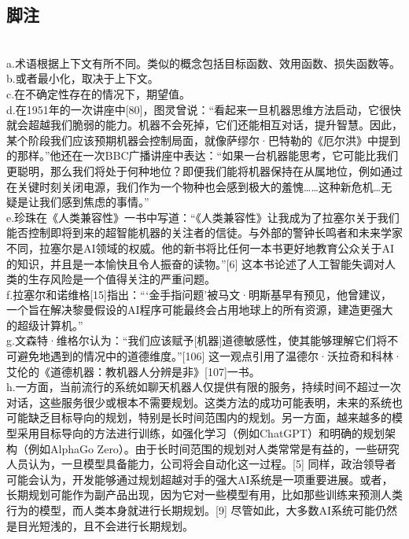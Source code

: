 \subsection{脚注}\\
a.术语根据上下文有所不同。类似的概念包括目标函数、效用函数、损失函数等。\\
b.或者最小化，取决于上下文。\\
c.在不确定性存在的情况下，期望值。\\
d.在1951年的一次讲座中[80]，图灵曾说：“看起来一旦机器思维方法启动，它很快就会超越我们脆弱的能力。机器不会死掉，它们还能相互对话，提升智慧。因此，某个阶段我们应该预期机器会控制局面，就像萨缪尔·巴特勒的《厄尔洪》中提到的那样。”他还在一次BBC广播讲座中表达：“如果一台机器能思考，它可能比我们更聪明，那么我们将处于何种地位？即便我们能将机器保持在从属地位，例如通过在关键时刻关闭电源，我们作为一个物种也会感到极大的羞愧……这种新危机…无疑是让我们感到焦虑的事情。”\\
e.珍珠在《人类兼容性》一书中写道：“《人类兼容性》让我成为了拉塞尔关于我们能否控制即将到来的超智能机器的关注者的信徒。与外部的警钟长鸣者和未来学家不同，拉塞尔是AI领域的权威。他的新书将比任何一本书更好地教育公众关于AI的知识，并且是一本愉快且令人振奋的读物。”[6] 这本书论述了人工智能失调对人类的生存风险是一个值得关注的严重问题。\\
f.拉塞尔和诺维格[15]指出：“‘金手指问题’被马文·明斯基早有预见，他曾建议，一个旨在解决黎曼假设的AI程序可能最终会占用地球上的所有资源，建造更强大的超级计算机。”\\
g.文森特·维格尔认为：“我们应该赋予[机器]道德敏感性，使其能够理解它们将不可避免地遇到的情况中的道德维度。”[106] 这一观点引用了温德尔·沃拉奇和科林·艾伦的《道德机器：教机器人分辨是非》[107]一书。\\
h.一方面，当前流行的系统如聊天机器人仅提供有限的服务，持续时间不超过一次对话，这些服务很少或根本不需要规划。这类方法的成功可能表明，未来的系统也可能缺乏目标导向的规划，特别是长时间范围内的规划。另一方面，越来越多的模型采用目标导向的方法进行训练，如强化学习（例如ChatGPT）和明确的规划架构（例如AlphaGo Zero）。由于长时间范围的规划对人类常常是有益的，一些研究人员认为，一旦模型具备能力，公司将会自动化这一过程。[5] 同样，政治领导者可能会认为，开发能够通过规划超越对手的强大AI系统是一项重要进展。或者，长期规划可能作为副产品出现，因为它对一些模型有用，比如那些训练来预测人类行为的模型，而人类本身就进行长期规划。[9] 尽管如此，大多数AI系统可能仍然是目光短浅的，且不会进行长期规划。
